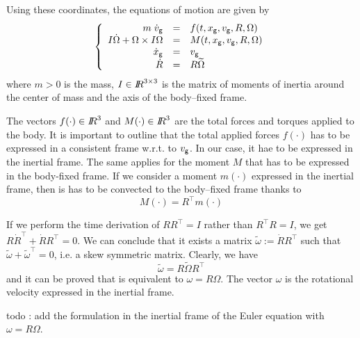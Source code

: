 Using these coordinates, the equations of motion are given by 
\begin{equation}
  \label{eq:motion-NewtonEuler}
  \left\{\begin{array}{rcl}
      m \;\dot v_{\sf \small g}  & = &f(t,x_{\sf \small g}, v_{\sf \small g},  R,  \Omega) \\
      I \dot \Omega + \Omega \times I \Omega &= & M(t,x_{\sf \small g}, v_{\sf \small g}, R, \Omega) \\
      \dot x_{\sf \small g}&=& v_{\sf \small g}\\
      \dot R  &=& R \widetilde \Omega
    \end{array}
  \right.
\end{equation}
where $m> 0$ is the mass, $I\in \mbox{\rm $I\!\!R$}^{3\times 3}$ is the matrix of moments of inertia around the center of mass and the axis of the body--fixed frame.

The vectors $f(\cdot)\in \mbox{\rm $I\!\!R$}^3$ and $M(\cdot)\in \mbox{\rm $I\!\!R$}^3$ are the total forces and torques applied to the body. It is important to outline that the total applied forces $f(\cdot)$ has to be expressed in a consistent frame w.r.t. to $v_{\sf \small g}$. In our case, it hae to be expressed in the inertial frame. The same applies for the moment $M$ that has to be expressed in the body-fixed frame. If we consider a moment $m(\cdot)$ expressed in the inertial frame, then is has to be convected to  the body--fixed frame thanks to
\begin{equation}
  \label{eq:convected_moment}
  M (\cdot) =R^\top  m (\cdot)
\end{equation}


\begin{remark}
If we perform the time derivation of $RR^\top =I$ rather than $R^\top R=I$, we get $R \dot R^\top + \dot R R^\top =0$.  We can conclude that it exists a matrix $\tilde \omega := \dot R R^\top $ such that $\tilde \omega + \tilde \omega^\top=0$, i.e. a skew symmetric matrix. Clearly, we have
 \begin{equation}
   \label{eq:31}
   \tilde \omega = R \tilde \Omega R^\top
 \end{equation}
 and it can be proved that is equivalent to $ \omega =R \Omega$. The vector $\omega$ is the rotational velocity expressed in the inertial frame.
\end{remark}
 
\begin{ndrva}
  todo : add the formulation in the inertial frame of the Euler equation with $\omega =R \Omega$.
\end{ndrva}

